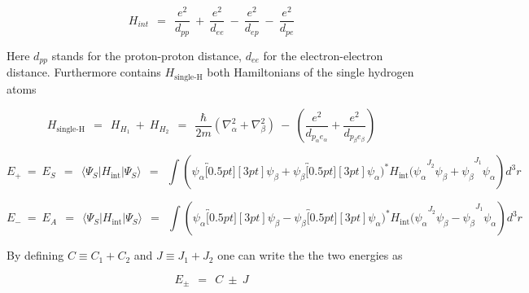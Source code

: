 \documentclass[10pt]{report}
\numberwithin{equation}{chapter}
\begin{document}
\begin{equation}
  H_{int} ~~=~~ \frac{e^2}{d_{pp}} ~+~ \frac{e^2}{d_{ee}} ~-~ \frac{e^2}{d_{ep}} ~-~ \frac{e^2}{d_{pe}}
\end{equation}

Here $d_{pp}$ stands for the proton-proton distance, $d_{ee}$ for the electron-electron distance.
Furthermore contains $H_\text{single-H}$ both Hamiltonians of the single hydrogen atoms

\begin{equation}
  H_\text{single-H} ~~=~~ H_{H_1} ~+~ H_{H_2} ~~=~~ 
  \frac{\hbar}{2m} \left( \nabla^2_\alpha + \nabla^2_\beta \right) ~-~ 
  \left(\frac{e^2}{d_{p_\alpha e_\alpha}} + \frac{e^2}{d_{p_\beta e_\beta}} \right)
\end{equation}



\begin{equation}
  E_+ ~=~E_S ~~=~~ \langle \Psi_S | H_\text{int} | \Psi_S \rangle ~~=~~
  \int ( \psi_\alpha \overbracket[0.5pt][3pt]{ \psi_\beta + \psi_\beta \overbracket[0.5pt][3pt]{ \psi_\alpha )^* H_\text{int} 
  ( \psi_\alpha }^{J_2} \psi_\beta + \psi_\beta}^{J_1}  \psi_\alpha ) d^3r
\end{equation}



\begin{equation}
  E_- ~=~E_A ~~=~~ \langle \Psi_S | H_\text{int} | \Psi_S \rangle ~~=~~
  \int ( \psi_\alpha \overbracket[0.5pt][3pt]{ \psi_\beta - \psi_\beta \overbracket[0.5pt][3pt]{ \psi_\alpha )^* H_\text{int} 
  ( \psi_\alpha }^{J_2} \psi_\beta - \psi_\beta}^{J_1} \psi_\alpha ) d^3r
\end{equation}


By defining $C \equiv C_1+C_2$ and $J \equiv J_1+J_2$ one can write the the two energies as

\begin{equation}
  E_\pm ~~=~~ C ~\pm~ J
\end{equation}
\end{document}
